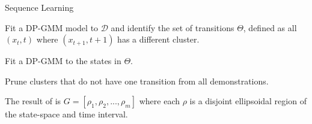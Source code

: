\begin{phase}[t]
\small
\DontPrintSemicolon
\caption{Sequence Learning \label{alg:tsh1}}

Fit a DP-GMM model to $\mathcal{D}$ and identify the set of transitions $\Theta$, defined as all $(x_t,t)$  where  $(x_{t+1},t+1)$  has a different cluster.

Fit a DP-GMM to the states in $\Theta$.

Prune clusters that do not have one transition from all demonstrations.

The result of is $G = [\rho_1, \rho_2,...,\rho_m]$ where each $\rho$ is a disjoint ellipsoidal region of the state-space and time interval.

\end{phase}
